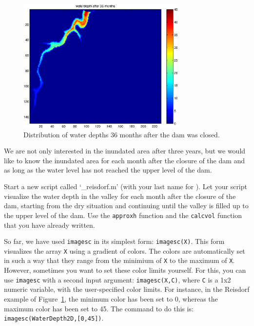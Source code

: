 \begin{figure}[htbp]
  \centering
    \includegraphics[width=0.75\textwidth]{./../eps/lake-reisdorf-36-months.eps}
  \caption{Distribution of water depths 36 months after the dam was closed.}
  \label{fig:lake-reisdorf-36-months}
\end{figure}

\noindent We are not only interested in the inundated area after three years, but we would like to know the inundated area for each month after the closure of the dam and as long as the water level has not reached the upper level of the dam.

\begin{action}
Start a new script called `\_reisdorf.m' (with your last name for ). Let your script visualize the water depth in the valley for each month after the closure of the dam, starting from the dry situation and continuing until the valley is filled up to the upper level of the dam. Use the {\tt approxh} function and the {\tt calcvol} function that you have already written.
\end{action}

\noindent So far, we have used {\tt imagesc} in its simplest form: {\tt imagesc(X)}. This form visualizes the array {\tt X} using a gradient of colors. The colors are automatically set in such a way that they range from the minimium of {\tt X} to the maximum of {\tt X}. However, sometimes you want to set these color limits yourself. For this, you can use {\tt imagesc} with a second input argument: {\tt imagesc(X,C)}, where {\tt C} is a 1x2 numeric variable, with the user-specified color limits. For instance, in the Reisdorf example of Figure~\ref{fig:lake-reisdorf-36-months}, the minimum color has been set to 0, whereas the maximum color has been set to 45. The command to do this is: {\tt imagesc(WaterDepth2D,[0,45])}.

